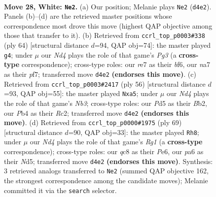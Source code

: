 \documentclass[11pt]{article}
\begin{document}
\clearpage

\begin{figure}[p]\centering
\begin{subfigure}{0.46\textwidth}\centering
\resizebox{\linewidth}{!}{%
\newchessgame
\chessboard[
  setfen={1rq2b2/n3rk2/p2p1pp1/2pP3p/RP1NP3/5R1P/3B1PP1/1Q4K1 w - c6 0 28},
  showmover=false,
  pgfstyle=straightmove, color=movearrow, markmove={d4-e2}
]}
\caption{}
\end{subfigure}\hfill
\begin{subfigure}{0.46\textwidth}\centering
\resizebox{\linewidth}{!}{%
\newchessgame
\chessboard[
  setfen={3rrk2/5p2/R2p1bq1/p2P2p1/1p1P1p2/4P1P1/P2Q1PB1/4R1K1 w - - 0 33},
  showmover=false,
  pgfstyle=straightmove, color=movearrow, markmove={g3-g4}
]}
\caption{}
\end{subfigure}
\\[4pt]
\begin{subfigure}{0.46\textwidth}\centering
\resizebox{\linewidth}{!}{%
\newchessgame
\chessboard[
  setfen={1r1r2k1/5pp1/1nq2b1p/p7/PppP4/1N2P2P/1BR1QPP1/R5K1 w - - 0 29},
  showmover=false,
  pgfstyle=straightmove, color=movearrow, markmove={b3-a5}
]}
\caption{}
\end{subfigure}\hfill
\begin{subfigure}{0.46\textwidth}\centering
\resizebox{\linewidth}{!}{%
\newchessgame
\chessboard[
  setfen={6r1/p1k2p1P/1p2p1r1/3nPp2/q1pR1P2/2P2Q1P/1P2KB2/3R4 b - - 0 35},
  showmover=false,
  pgfstyle=straightmove, color=movearrow, markmove={g8-h8}
]}
\caption{}
\end{subfigure}
\caption{\textbf{Move 28, White: \texttt{Ne2}.} (a) Our position; Melanie plays \texttt{Ne2} (\texttt{d4e2}). Panels (b)--(d) are the retrieved master positions whose correspondence most drove this move (highest QAP objective among those that transfer to it). (b) Retrieved from \texttt{ccrl\_top\_p0003\#338} (ply 64) [structural distance $d$=94, QAP obj=74]: the master played \texttt{g4}; under $\mu$ our \emph{Nd4} plays the role of that game's \emph{Pg3} (a \textbf{cross-type} correspondence); cross-type roles: our \emph{r}e7 as their \emph{b}f6, our \emph{n}a7 as their \emph{p}f7; transferred move \texttt{d4e2} \textbf{(endorses this move)}. (c) Retrieved from \texttt{ccrl\_top\_p0003\#2417} (ply 56) [structural distance $d$=93, QAP obj=55]: the master played \texttt{Nxa5}; under $\mu$ our \emph{Nd4} plays the role of that game's \emph{Nb3}; cross-type roles: our \emph{P}d5 as their \emph{B}b2, our \emph{P}b4 as their \emph{R}c2; transferred move \texttt{d4e2} \textbf{(endorses this move)}. (d) Retrieved from \texttt{ccrl\_top\_p0000\#1975} (ply 69) [structural distance $d$=90, QAP obj=33]: the master played \texttt{Rh8}; under $\mu$ our \emph{Nd4} plays the role of that game's \emph{Rg1} (a \textbf{cross-type} correspondence); cross-type roles: our \emph{q}c8 as their \emph{P}e6, our \emph{p}a6 as their \emph{N}d5; transferred move \texttt{d4e2} \textbf{(endorses this move)}. Synthesis: 3 retrieved analogs transferred to \texttt{Ne2} (summed QAP objective 162, the strongest correspondence among the candidate moves); Melanie committed it via the \texttt{search} selector.}
\label{fig:thought-m54}
\end{figure}
\end{document}
